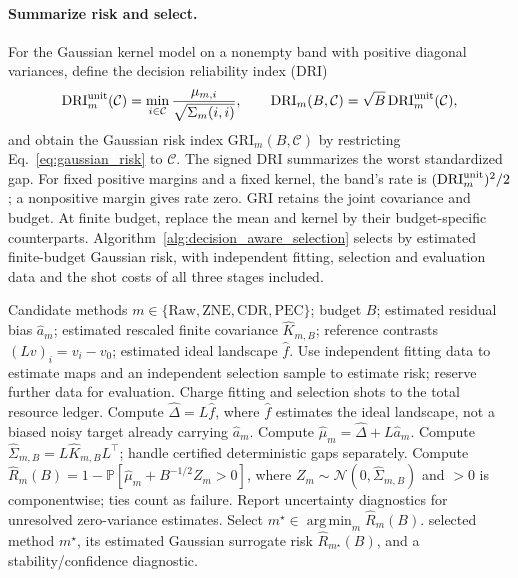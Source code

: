 \documentclass[a4paper,onecolumn,unpublished,nopdfoutputerror]{quantumarticle}
\theoremstyle{plain}
\theoremstyle{definition}
\newcommand{\Prob}{\mathbb{P}}
\newcommand{\calC}{\mathcal{C}}
\newcommand{\calN}{\mathcal{N}}
\newcommand{\Raw}{\mathrm{Raw}}
\newcommand{\ZNE}{\mathrm{ZNE}}
\newcommand{\CDR}{\mathrm{CDR}}
\newcommand{\PEC}{\mathrm{PEC}}
\newcommand{\argmin}{\operatorname*{arg\,min}}
\newcommand{\DRI}{\mathrm{DRI}}
\newcommand{\GRI}{\mathrm{GRI}}
\newcommand{\1}{\mathbf{1}}
\begin{document}
\paragraph{Summarize risk and select.}
For the Gaussian kernel model on a nonempty band with positive diagonal variances, define the decision reliability index (DRI)
\begin{equation}
\DRI_m^{\rm unit}(\calC)=\min_{i\in\calC}\frac{\mu_{m,i}}{\sqrt{\Sigma_m(i,i)}},
\qquad \DRI_m(B,\calC)=\sqrt B\,\DRI_m^{\rm unit}(\calC),
\end{equation}
and obtain the Gaussian risk index $\GRI_m(B,\calC)$ by restricting Eq.~\eqref{eq:gaussian_risk} to $\calC$. The signed DRI summarizes the worst standardized gap. For fixed positive margins and a fixed kernel, the band's rate is $(\DRI_m^{\rm unit})^2/2$; a nonpositive margin gives rate zero. GRI retains the joint covariance and budget. At finite budget, replace the mean and kernel by their budget-specific counterparts. Algorithm~\ref{alg:decision_aware_selection} selects by estimated finite-budget Gaussian risk, with independent fitting, selection and evaluation data and the shot costs of all three stages included.

\begin{algorithm}[!ht]
\caption{QEM selection for strict argmin}
\label{alg:decision_aware_selection}
\begin{algorithmic}[1]
\Require Candidate methods $m\in\{\Raw,\ZNE,\CDR,\PEC\}$; budget $B$; estimated residual bias $\widehat a_m$; estimated rescaled finite covariance $\widehat K_{m,B}$; reference contrasts $(Lv)_i=v_i-v_0$; estimated ideal landscape $\widehat f$.
\State Use independent fitting data to estimate maps and an independent selection sample to estimate risk; reserve further data for evaluation.
\State Charge fitting and selection shots to the total resource ledger.
\State Compute $\widehat\Delta=L\widehat f$, where $\widehat f$ estimates the ideal landscape, not a biased noisy target already carrying $\widehat a_m$.
    \State Compute $\widehat\mu_m=\widehat\Delta+L\widehat a_m$.
    \State Compute $\widehat\Sigma_{m,B}=L\widehat K_{m,B}L^\top$; handle certified deterministic gaps separately.
    \State Compute $\widehat R_m(B)=1-\Prob[\widehat\mu_m+B^{-1/2}Z_m>0]$, where $Z_m\sim\calN(0,\widehat\Sigma_{m,B})$ and $>0$ is componentwise; ties count as failure.
    \State Report uncertainty diagnostics for unresolved zero-variance estimates.
\EndFor
\State Select $m^\star\in\argmin_m \widehat R_m(B)$.
\State \Return selected method $m^\star$, its estimated Gaussian surrogate risk $\widehat R_{m^\star}(B)$, and a stability/confidence diagnostic.
\end{algorithmic}
\end{algorithm}
\end{document}
